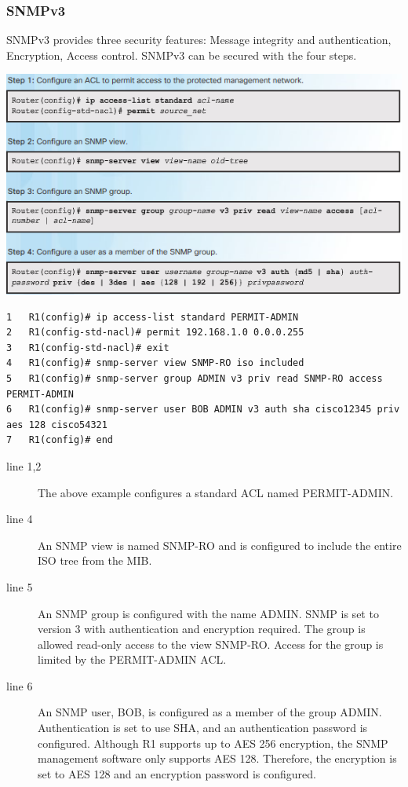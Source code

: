 \subsubsection{SNMPv3}
SNMPv3 provides three security features: Message integrity and authentication, Encryption, Access control. SNMPv3 can be secured with the four steps.\\
\begin{listing}
\includegraphics[scale=1]{pictures/SNMPv3steps.PNG} 
\end{listing}

\begin{verbatim}
1	R1(config)# ip access-list standard PERMIT-ADMIN
2	R1(config-std-nacl)# permit 192.168.1.0 0.0.0.255
3	R1(config-std-nacl)# exit
4	R1(config)# snmp-server view SNMP-RO iso included
5	R1(config)# snmp-server group ADMIN v3 priv read SNMP-RO access PERMIT-ADMIN
6	R1(config)# snmp-server user BOB ADMIN v3 auth sha cisco12345 priv aes 128 cisco54321
7	R1(config)# end
\end{verbatim}
\begin{description}
\item[line 1,2] The above example configures a standard ACL named PERMIT-ADMIN. 
\item[line 4] An SNMP view is named SNMP-RO and is configured to include the entire ISO tree from the MIB. 
\item[line 5] An SNMP group is configured with the name ADMIN. SNMP is set to version 3 with authentication and encryption required. The group is allowed read-only access to the view SNMP-RO. Access for the group is limited by the PERMIT-ADMIN ACL. 
\item[line 6] An SNMP user, BOB, is configured as a member of the group ADMIN. Authentication is set to use SHA, and an authentication password is configured. Although R1 supports up to AES 256 encryption, the SNMP management software only supports AES 128. Therefore, the encryption is set to AES 128 and an encryption password is configured.
\end{description}

